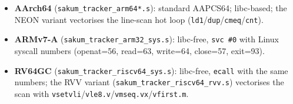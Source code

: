 \begin{itemize}
  \item \textbf{AArch64} (\texttt{sakum\_tracker\_arm64*.s}): standard AAPCS64;
    libc-based; the NEON variant vectorises the line-scan hot loop
    (\texttt{ld1}/\texttt{dup}/\texttt{cmeq}/\texttt{cnt}).
  \item \textbf{ARMv7-A} (\texttt{sakum\_tracker\_arm32\_sys.s}): libc-free,
    \texttt{svc \#0} with Linux syscall numbers (openat=56, read=63,
    write=64, close=57, exit=93).
  \item \textbf{RV64GC} (\texttt{sakum\_tracker\_riscv64\_sys.s}): libc-free,
    \texttt{ecall} with the same numbers; the RVV variant
    (\texttt{sakum\_tracker\_riscv64\_rvv.s}) vectorises the scan with
    \texttt{vsetvli}/\texttt{vle8.v}/\texttt{vmseq.vx}/\texttt{vfirst.m}.
\end{itemize}

